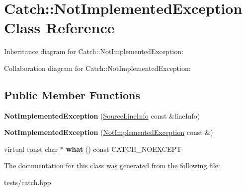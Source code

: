 \hypertarget{class_catch_1_1_not_implemented_exception}{}\section{Catch\+:\+:Not\+Implemented\+Exception Class Reference}
\label{class_catch_1_1_not_implemented_exception}


Inheritance diagram for Catch\+:\+:Not\+Implemented\+Exception\+:


Collaboration diagram for Catch\+:\+:Not\+Implemented\+Exception\+:
\subsection*{Public Member Functions}
\begin{DoxyCompactItemize}
\item 
\mbox{\label{class_catch_1_1_not_implemented_exception_ab4f0a5c39d8ffb72c664e2c07e180634}} 
{\bfseries Not\+Implemented\+Exception} (\hyperlink{struct_catch_1_1_source_line_info}{Source\+Line\+Info} const \&line\+Info)
\item 
\mbox{\label{class_catch_1_1_not_implemented_exception_a508a7a833455da2d3c10ea1a9d45e982}} 
{\bfseries Not\+Implemented\+Exception} (\hyperlink{class_catch_1_1_not_implemented_exception}{Not\+Implemented\+Exception} const \&)
\item 
\mbox{\label{class_catch_1_1_not_implemented_exception_ad4c13963f1a8feacda0cd331adda89e3}} 
virtual const char $\ast$ {\bfseries what} () const C\+A\+T\+C\+H\+\_\+\+N\+O\+E\+X\+C\+E\+PT
\end{DoxyCompactItemize}


The documentation for this class was generated from the following file\+:\begin{DoxyCompactItemize}
\item 
tests/catch.\+hpp\end{DoxyCompactItemize}
